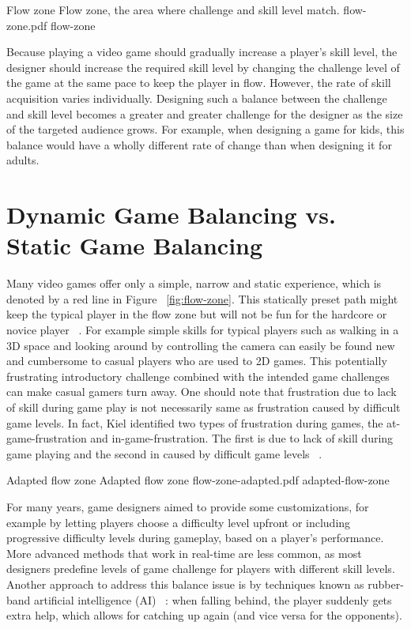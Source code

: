 \img
{Flow zone}
{Flow zone, the area where challenge and skill level match.}
{flow-zone.pdf}
{flow-zone}

Because playing a video game should gradually increase a player's skill level, the designer should increase the required skill level by changing the challenge level of the game at the same pace to keep the player in flow. However, the rate of skill acquisition varies individually. Designing such a balance between the challenge and skill level becomes a greater and greater challenge for the designer as the size of the targeted audience grows. For example, when designing a game for kids, this balance would have a wholly different rate of change than when designing it for adults.

\section{Dynamic Game Balancing vs. Static Game Balancing}
Many video games offer only a simple, narrow and static experience, which is denoted by a red line in Figure ~\ref{fig:flow-zone}. This statically preset path might keep the typical player in the flow zone but will not be fun for the hardcore or novice player ~\cite{chen2007flow}. For example simple skills for typical players such as walking in a 3D space and looking around by controlling the camera can easily be found new and cumbersome to casual players who are used to 2D games. This potentially frustrating introductory challenge combined with the intended game challenges can make casual gamers turn away. One should note that frustration due to lack of skill during game play is not necessarily same as frustration caused by difficult game levels. In fact, Kiel identified two types of frustration during games, the at-game-frustration and in-game-frustration. The first is due to lack of skill during game playing and the second in caused by difficult game levels ~\cite{gilleade2004using}.

\img
{Adapted flow zone}
{Adapted flow zone}
{flow-zone-adapted.pdf}
{adapted-flow-zone}

For many years, game designers aimed to provide some customizations, for example by letting players choose a difficulty level upfront or including progressive difficulty levels during gameplay, based on a player's performance. More advanced methods that work in real-time are less common, as most designers predefine levels of game challenge for players with different skill levels. Another approach to address this balance issue is by techniques known as rubber-band artificial intelligence (AI) ~\cite{champandard2003ai}: when falling behind, the player suddenly gets extra help, which allows for catching up again (and vice versa for the opponents).


